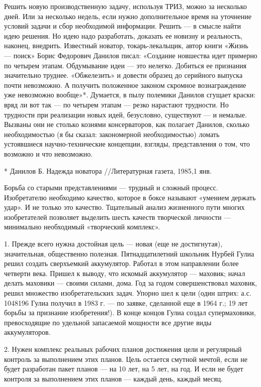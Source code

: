 Решить  новую  производственную  задачу,   используя  ТРИЗ,  можно  за
несколько  дней. Или  за несколько  недель, если  нужно дополнительное
время  на  уточнение условий  задачи  и  сбор необходимой  информации.
Решить  — в  смысле  найти  идею решения.  Но  идею надо  разработать,
доказать  ее  новизну  и   реальность,  наконец,  внедрить.  Известный
новатор, токарь-лекальщик, автор книги «Жизнь — поиск» Борис Федорович
Данилов писал:  «Создание новшества  идет примерно по  четырем этапам.
Обдумывание  идеи —  это  нелегко. Добиться  ее признания  значительно
труднее.  «Обжелезить» и  довести образец  до серийного  выпуска почти
невозможно. А получить положенное  законом скромное вознаграждение уже
невозможно вообще»*. Думается, в пылу полемики Данилов сгущает краски:
вряд  ли вот  так —  по четырем  этапам —  резко нарастают  трудности.
Но  трудности  при  реализации   новых  идей,  безусловно,  существуют
—  и  немалые.  Вызваны  они не  столько  кознями  консерваторов,  как
полагает Данилов,  сколько необходимостью  (я бы  сказал: закономерной
необходимостью)   ломать  устоявшиеся   научно-технические  концепции,
взгляды, представления о том, что возможно и что невозможно.

* Данилов Б. Надежда новатора //Литературная газета, 1985,1 янв.


Борьба  со  старыми  представлениями  —  трудный  и  сложный  процесс.
Изобретателю необходимо  качество, которое  в боксе  называют «умением
держать удар». И не только  это качество. Тщательный анализ жизненного
пути многих изобретателей позволяет  выделить шесть качеств творческой
личности — минимально необходимый «творческий комплекс».

1. Прежде  всего нужна  достойная цель —  новая (еще  не достигнутая),
значительная, общественно  полезная. Пятнадцатилетний  школьник Нурбей
Гулиа   решил  создать   сверхъемкий  аккумулятор.   Работал  в   этом
направлении  более  четверти  века.   Пришел  к  выводу,  что  искомый
аккумулятор —  маховик; начал делать  маховики — своими  силами, дома.
Год за годом совершенствовал маховик, решил множество изобретательских
задач. Упорно  шел к цели  (один штрих:  а.с. 1048196 Гулиа  получил в
1983  г. —  по заявке,  сделанной  еще в  1964  г.; 19  лет борьбы  за
признание изобретения!).  В конце  концов Гулиа  создал супермаховики,
превосходящие  по   удельной  запасаемой  мощности  все   другие  виды
аккумуляторов.

2. Нужен комплекс реальных рабочих планов достижения цели и регулярный
контроль  за выполнением  этих планов.  Цель остается  смутной мечтой,
если не будет разработан пакет планов — на 10 лет, на 5 лет, на год. И
если  не будет  контроля за  выполнением  этих планов  — каждый  день,
каждый месяц.

